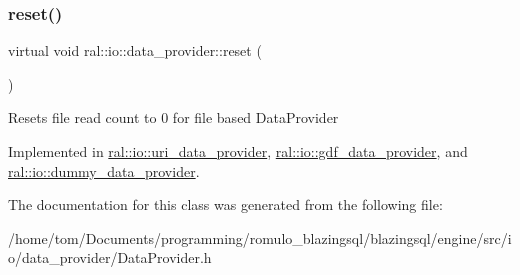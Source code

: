 \subsubsection{\texorpdfstring{reset()}{reset()}}
{\footnotesize\ttfamily virtual void ral\+::io\+::data\+\_\+provider\+::reset (\begin{DoxyParamCaption}{ }\end{DoxyParamCaption})\hspace{0.3cm}{\ttfamily [pure virtual]}}

Resets file read count to 0 for file based Data\+Provider 

Implemented in \hyperlink{classral_1_1io_1_1uri__data__provider_aaab8f4f12a00b546a4cc01260d9199c8}{ral\+::io\+::uri\+\_\+data\+\_\+provider}, \hyperlink{classral_1_1io_1_1gdf__data__provider_a6bd49396fc1bdeacd68566915e29a15f}{ral\+::io\+::gdf\+\_\+data\+\_\+provider}, and \hyperlink{classral_1_1io_1_1dummy__data__provider_a109b92459b919a31171a6ec00eee0eeb}{ral\+::io\+::dummy\+\_\+data\+\_\+provider}.



The documentation for this class was generated from the following file\+:\begin{DoxyCompactItemize}
\item 
/home/tom/\+Documents/programming/romulo\+\_\+blazingsql/blazingsql/engine/src/io/data\+\_\+provider/Data\+Provider.\+h\end{DoxyCompactItemize}
